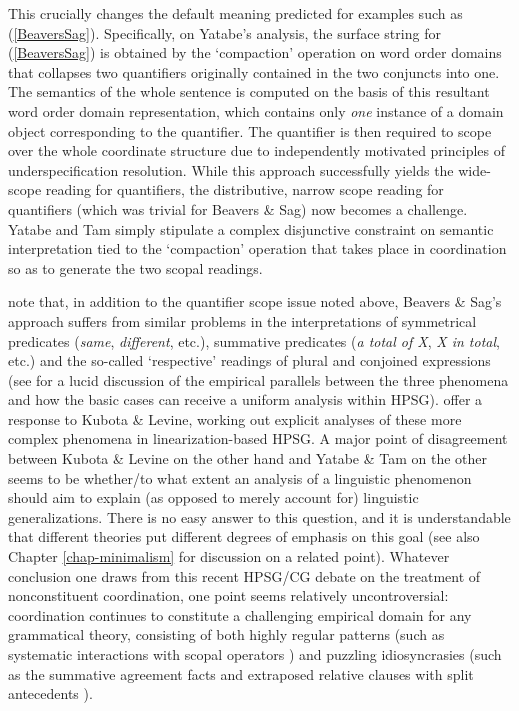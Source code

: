 \documentclass[output=paper]{langsci/langscibook}
\begin{document}
This crucially changes the default meaning predicted for examples such
as (\ref{BeaversSag}). Specifically, on Yatabe's analysis, the surface
string for (\ref{BeaversSag}) is obtained by the `compaction'
operation on word order domains that collapses two quantifiers
originally contained in the two conjuncts into one. The semantics of
the whole sentence is computed on the basis of this resultant word
order domain representation, which contains only \emph{one} instance
of a domain object corresponding to the quantifier. The quantifier is
then required to scope over the whole coordinate structure due to
independently motivated principles of underspecification resolution.
While this approach successfully yields the wide-scope reading for
quantifiers, the distributive, narrow scope reading for quantifiers
(which was trivial for Beavers \& Sag) now becomes a challenge. Yatabe
and Tam simply stipulate a complex disjunctive constraint on semantic
interpretation tied to the `compaction' operation that takes place in
coordination so as to generate the two scopal readings.

\citet{kubota-levine-coord} note that, in addition to the quantifier
scope issue noted above, Beavers \& Sag's approach suffers from similar problems
in the interpretations of symmetrical predicates (\textit{same},
\textit{different}, etc.), summative predicates (\textit{a total of
X}, \textit{X in total}, etc.) and the so-called `respective' readings
of plural and conjoined expressions (see \citet{chaves12} for a lucid
discussion of the empirical parallels between the three phenomena and
how the basic cases can receive a uniform analysis within HPSG).
\citet{yatabe-tam2017} offer a response to Kubota \& Levine, working out explicit
analyses of these more complex phenomena in linearization-based HPSG.
A major point of disagreement between Kubota \& Levine on the other
hand and Yatabe \& Tam on the other seems to be
whether/to what extent an analysis of a linguistic phenomenon
should aim to explain (as opposed to merely account for)
linguistic generalizations. There is no easy answer to this
question, and it is understandable that different theories put
different degrees of emphasis on this goal (see also Chapter \ref{chap-minimalism} for
discussion on a related point).
Whatever conclusion one draws from this recent HPSG/CG debate on
the treatment of nonconstituent coordination, one point seems 
relatively uncontroversial: coordination continues to constitute a challenging
empirical domain for any grammatical theory, consisting of both
highly regular patterns (such as systematic interactions with scopal
operators \citep{kubota-levine-coord,KubotaLevineBook}) and puzzling
idiosyncrasies (such as the summative agreement facts
\citep{postalextraction,yatabe-tam2017} and 
extraposed relative clauses with split antecedents 
\citep{PerlmutterRoss70,yatabe-tam2017}).
\end{document}

